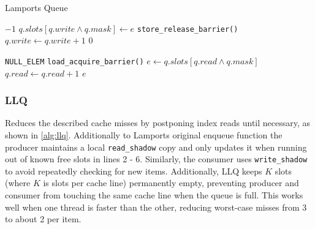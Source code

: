 \begin{algorithm}[!ht]
   \centering
   \captionsetup{justification=centering}
   \caption{Lamports Queue \cite{MaffioneCacheAware}}
   \label{alg:lamport-queue}
   \scriptsize
   \begin{algorithmic}[1]
            
               \State \Return $-1$ 
           \EndIf
           \State $q.slots[q.write \land q.mask] \gets e$
           \State \texttt{store\_release\_barrier()}
           \State $q.write \gets q.write + 1$
           \State \Return $0$
       \EndFunction
       
       \State
       
            
               \State \Return \texttt{NULL\_ELEM} 
           \EndIf
           \State \texttt{load\_acquire\_barrier()}
           \State $e \gets q.slots[q.read \land q.mask]$
           \State $q.read \gets q.read + 1$
           \State \Return $e$
       \EndFunction
   \end{algorithmic}
   \cite{MaffioneCacheAware}
\end{algorithm}

\subsubsection{\acl{LLQ}}
Reduces the described cache misses by postponing index reads until necessary, as shown in \cref{alg:llq}. Additionally to Lamports original enqueue function the producer maintains a local \texttt{read\_shadow} copy and only updates it when running out of known free slots in lines 2 - 6. Similarly, the consumer uses \texttt{write\_shadow} to avoid repeatedly checking for new items. Additionally, \ac{LLQ} keeps $K$ slots (where $K$ is slots per cache line) permanently empty, preventing producer and consumer from touching the same cache line when the queue is full. This works well when one thread is faster than the other, reducing worst-case misses from 3 to about 2 per item. \cite{MaffioneCacheAware}

